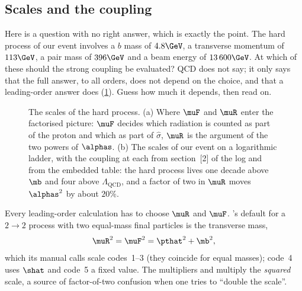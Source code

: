 \subsection{Scales and the coupling}
\label{sec:ancestral_home:scales_and_coupling}

Here is a question with no right answer, which is exactly the point. The
hard process of our event involves a $b$ mass of $4.8\GeV$, a transverse
momentum of $113\GeV$, a pair mass of $396\GeV$ and a beam energy of
$13\,600\GeV$. At which of these should the strong coupling be evaluated?
QCD does not say; it only says that the full answer, to all orders, does not
depend on the choice, and that a leading-order answer does
(\cref{fig:ancestral_home:scales_sketch}). Guess how much it depends,
then read on.

\begin{figure}[htbp]\centering
\resizebox{\textwidth}{!}{}
\caption[Where the two scales enter, and the scales of our event on a logarithmic ladder]{The scales of the hard process. (a) Where $\muF$ and $\muR$ enter the factorised picture: $\muF$ decides which radiation is counted as part of the proton and which as part of $\hat\sigma$, $\muR$ is the argument of the two powers of $\alphas$. (b) The scales of our event on a logarithmic ladder, with the coupling at each from section~[2] of the  log and from the embedded table: the hard process lives one decade above $\mb$ and four above $\Lambda_{\mathrm{QCD}}$, and a factor of two in $\muR$ moves $\alphas^2$ by about $20\%$.}
\label{fig:ancestral_home:scales_sketch}
\end{figure}

Every leading-order calculation has to choose $\muR$ and $\muF$. \PYTHIA's
default for a $2\to2$ process with two equal-mass final particles is the
transverse mass,
\begin{equation}
  \muR^2 = \muF^2 = \pthat^2 + \mb^2 ,
  \label{eq:ancestral_home:scale_choice}
\end{equation}
which its manual calls scale codes~1--3 (they coincide for equal masses);
code~4 uses $\shat$ and code~5 a fixed value. The multipliers
 and  multiply the
\emph{squared} scale, a source of factor-of-two confusion when one tries to
``double the scale''.

